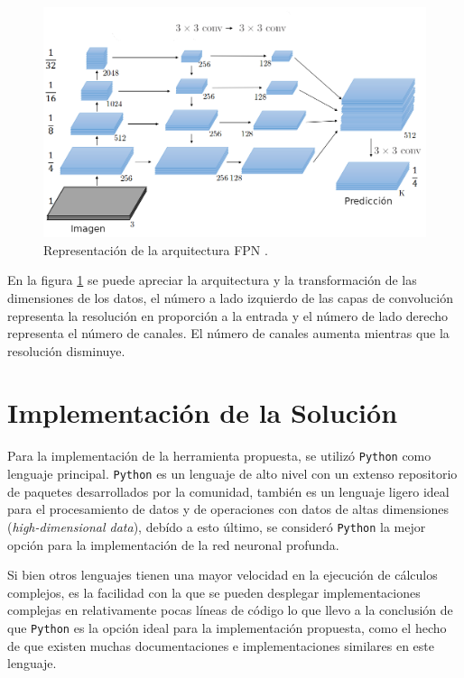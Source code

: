 \begin{figure}[h]
    \centering
    \includegraphics[scale=0.55]{Figuras/fpn_ar_esp_2.png}
    \caption{Representación de la arquitectura FPN \citep{fpn_2}.}
    \label{fig:fpn_map}
\end{figure}

En la figura \ref{fig:fpn_map} se puede apreciar la arquitectura y la transformación de las dimensiones de los datos, el número a lado izquierdo de las capas de convolución representa la resolución en proporción a la entrada y el número de lado derecho representa el número de canales. El número de canales aumenta mientras que la resolución disminuye.

\section{Implementación de la Solución}
Para la implementación de la herramienta propuesta, se utilizó \texttt{Python} como lenguaje principal. \texttt{Python} es un lenguaje de alto nivel con un extenso repositorio de paquetes desarrollados por la comunidad, también es un lenguaje ligero ideal para el procesamiento de datos y de operaciones con datos de altas dimensiones (\emph{high-dimensional data}), debído a esto último, se consideró \texttt{Python} la mejor opción para la implementación de la red neuronal profunda.

Si bien otros lenguajes tienen una mayor velocidad en la ejecución de cálculos complejos, es la facilidad con la que se pueden desplegar implementaciones complejas en relativamente pocas líneas de código lo que llevo a la conclusión de que \texttt{Python} es la opción ideal para la implementación propuesta, como el hecho de que existen muchas documentaciones e implementaciones similares en este lenguaje.

